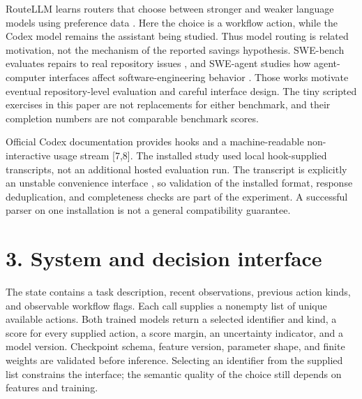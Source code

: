 \documentclass[11pt]{article}
\begin{document}
RouteLLM learns routers that choose between stronger and weaker language models using preference data \cite{r4}. Here the choice is a workflow action, while the Codex model remains the assistant being studied. Thus model routing is related motivation, not the mechanism of the reported savings hypothesis. SWE-bench evaluates repairs to real repository issues \cite{r5}, and SWE-agent studies how agent-computer interfaces affect software-engineering behavior \cite{r6}. Those works motivate eventual repository-level evaluation and careful interface design. The tiny scripted exercises in this paper are not replacements for either benchmark, and their completion numbers are not comparable benchmark scores.

Official Codex documentation provides hooks and a machine-readable non-interactive usage stream [7,8]. The installed study used local hook-supplied transcripts, not an additional hosted evaluation run. The transcript is explicitly an unstable convenience interface \cite{r7}, so validation of the installed format, response deduplication, and completeness checks are part of the experiment. A successful parser on one installation is not a general compatibility guarantee.

\section*{3. System and decision interface}
The state contains a task description, recent observations, previous action kinds, and observable workflow flags. Each call supplies a nonempty list of unique available actions. Both trained models return a selected identifier and kind, a score for every supplied action, a score margin, an uncertainty indicator, and a model version. Checkpoint schema, feature version, parameter shape, and finite weights are validated before inference. Selecting an identifier from the supplied list constrains the interface; the semantic quality of the choice still depends on features and training.
\end{document}
